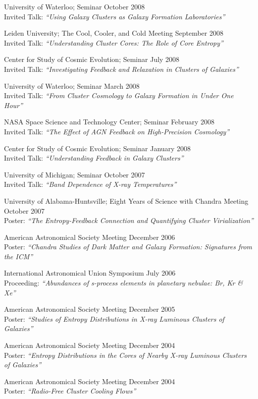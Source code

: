 \documentclass[12pt]{cv}
\begin{document}
University of Waterloo; Seminar \hfill October 2008\\
Invited Talk: {\textit{``Using Galaxy Clusters as Galaxy Formation Laboratories''}}

Leiden University; The Cool, Cooler, and Cold Meeting \hfill September 2008\\
Invited Talk: {\textit{``Understanding Cluster Cores: The Role of Core Entropy''}}
 
Center for Study of Cosmic Evolution; Seminar \hfill July 2008\\
Invited Talk: {\textit{``Investigating Feedback and Relaxation in Clusters of Galaxies''}}

University of Waterloo; Seminar \hfill March 2008\\
Invited Talk: {\textit{``From Cluster Cosmology to Galaxy Formation in Under One Hour''}}

NASA Space Science and Technology Center; Seminar \hfill February 2008\\
Invited Talk: {\textit{``The Effect of AGN Feedback on High-Precision Cosmology''}}

Center for Study of Cosmic Evolution; Seminar \hfill January 2008\\
Invited Talk: {\textit{``Understanding Feedback in Galaxy Clusters''}}

University of Michigan; Seminar \hfill October 2007\\
Invited Talk: {\textit{``Band Dependence of X-ray Temperatures''}}

University of Alabama-Huntsville; Eight Years of Science with Chandra Meeting \hfill October 2007\\
Poster: {\textit{``The Entropy-Feedback Connection and Quantifying Cluster Virialization''}}

American Astronomical Society Meeting \hfill December 2006\\
Poster: {\textit{``Chandra Studies of Dark Matter and Galaxy Formation: Signatures from the ICM''}}

International Astronomical Union Symposium \hfill July 2006\\
Proceeding: {\textit{``Abundances of s-process elements in planetary nebulae: Br, Kr \& Xe''}}

American Astronomical Society Meeting \hfill December 2005\\
Poster: {\textit{``Studies of Entropy Distributions in X-ray Luminous Clusters of Galaxies''}}

American Astronomical Society Meeting \hfill December 2004\\
Poster: {\textit{``Entropy Distributions in the Cores of Nearby X-ray Luminous Clusters of Galaxies''}}

American Astronomical Society Meeting \hfill December 2004\\
Poster: {\textit{``Radio-Free Cluster Cooling Flows''}}
\end{document}

